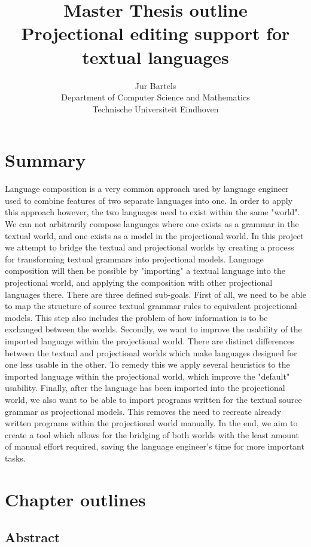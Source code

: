\documentclass[a4paper, 11pt]{article}
\title{\vspace{-2.0cm} Master Thesis outline \\ Projectional editing support for textual languages}
\author{Jur Bartels \\ Department of Computer Science and Mathematics\\ Technische Universiteit Eindhoven}
\begin{document}
\maketitle

\section*{Summary}
Language composition is a very common approach used by language engineer used to combine features of two separate languages into one. In order to apply this approach however, the two languages need to exist within the same "world". We can not arbitrarily compose languages where one exists as a grammar in the textual world, and one exists as a model in the projectional world. In this project we attempt to bridge the textual and projectional worlds by creating a process for transforming textual grammars into projectional models. Language composition will then be possible by "importing" a textual language into the projectional world, and applying the composition with other projectional languages there. There are three defined sub-goals. First of all, we need to be able to map the structure of source textual grammar rules to equivalent projectional models. This step also includes the problem of how information is to be exchanged between the worlds. Secondly, we want to improve the usability of the imported language within the projectional world. There are distinct differences between the textual and projectional worlds which make languages designed for one less usable in the other. To remedy this we apply several heuristics to the imported language within the projectional world, which improve the "default" usability. Finally, after the language has been imported into the projectional world, we also want to be able to import programs written for the textual source grammar as projectional models. This removes the need to recreate already written programs within the projectional world manually. In the end, we aim to create a tool which allows for the bridging of both worlds with the least amount of manual effort required, saving the language engineer's time for more important tasks. 

\section*{Chapter outlines}
	\subsection*{Abstract}
\end{document}
